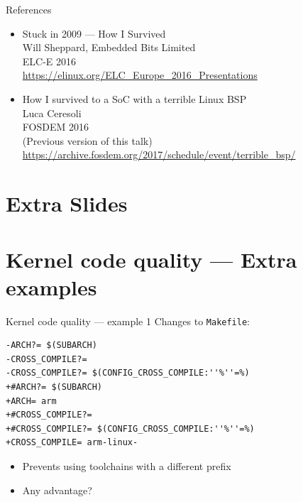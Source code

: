 \documentclass[xetex,table]{beamer}
\begin{document}
\begin{frame}{References}
  \begin{itemize}
    \item
      Stuck in 2009 --- How I Survived\\
      Will Sheppard, Embedded Bits Limited\\
      ELC-E 2016\\
      {\scriptsize\url{https://elinux.org/ELC_Europe_2016_Presentations}}
    \item
      How I survived to a SoC with a terrible Linux BSP\\
      Luca Ceresoli\\
      FOSDEM 2016\\
      (Previous version of this talk)\\
      {\scriptsize\url{https://archive.fosdem.org/2017/schedule/event/terrible_bsp/}}
  \end{itemize}
\end{frame}

\appendix

\section{Extra Slides}

\section{Kernel code quality --- Extra examples}

\begin{frame}[fragile]{Kernel code quality --- example 1}
  Changes to \texttt{Makefile}:

  \begin{verbatim}
-ARCH?= $(SUBARCH)
-CROSS_COMPILE?=
-CROSS_COMPILE?= $(CONFIG_CROSS_COMPILE:''%''=%)
+#ARCH?= $(SUBARCH)
+ARCH= arm
+#CROSS_COMPILE?=
+#CROSS_COMPILE?= $(CONFIG_CROSS_COMPILE:''%''=%)
+CROSS_COMPILE= arm-linux-
  \end{verbatim}

  \begin{itemize}
  \item Prevents using toolchains with a different prefix
  \item Any advantage?
  \end{itemize}
\end{frame}
\end{document}
